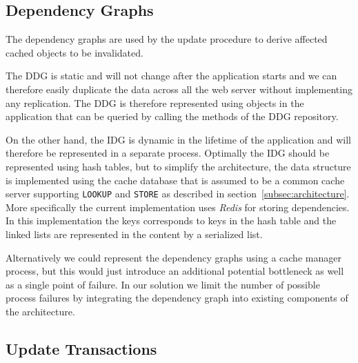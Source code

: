 \subsection{Dependency Graphs}
\label{subsec:dependency-graphs}

The dependency graphs are used by the update procedure to derive affected cached objects to be invalidated.

The DDG is static and will not change after the application starts and we can therefore easily duplicate the data across all the web server without implementing any replication. The DDG is therefore represented using objects in the application that can be queried by calling the methods of the DDG repository.

On the other hand, the IDG is dynamic in the lifetime of the application and will therefore be represented in a separate process. Optimally the IDG should be represented using hash tables, but to simplify the architecture, the data structure is implemented using the cache database that is assumed to be a common cache server supporting \verb$LOOKUP$ and \verb$STORE$ as described in section~\ref{subsec:architecture}. More specifically the current implementation uses \emph{Redis} for storing dependencies. In this implementation the keys corresponds to keys in the hash table and the linked lists are represented in the content by a serialized list.

Alternatively we could represent the dependency graphs using a cache manager process, but this would just introduce an additional potential bottleneck as well as a single point of failure. In our solution we limit the number of possible process failures by integrating the dependency graph into existing components of the architecture.


\subsection{Update Transactions}
\label{subsec:update-transactions}

